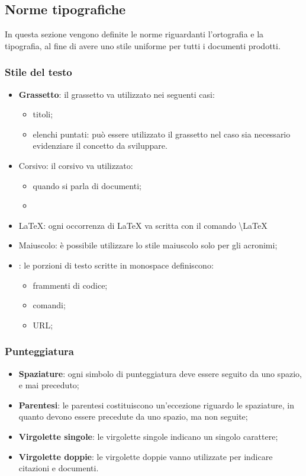 	
	\subsection{Norme tipografiche}
	In questa sezione vengono definite le norme riguardanti l'ortografia e la tipografia, al fine di avere uno stile uniforme per tutti i documenti prodotti.
		\subsubsection{Stile del testo}
		\begin{itemize}
			\item \textbf{Grassetto}: il grassetto va utilizzato nei seguenti casi:
			\begin{itemize}
				\item titoli;
				\item elenchi puntati: può essere utilizzato il grassetto nel caso sia necessario evidenziare il concetto da sviluppare.
			\end{itemize}
			\item Corsivo: il corsivo va utilizzato:
			\begin{itemize}
				\item quando si parla di documenti;
				\item 
			\end{itemize}
			\item \LaTeX: ogni occorrenza di \LaTeX{} va scritta con il comando \textbackslash LaTeX
			\item Maiuscolo: è possibile utilizzare lo stile maiuscolo solo per gli acronimi;
			\item {}: le porzioni di testo scritte in monospace definiscono:
			\begin{itemize}
				\item frammenti di codice;
				\item comandi;
				\item URL;
			\end{itemize} 
		\end{itemize}
		\subsubsection{Punteggiatura}
		\begin{itemize}
			\item \textbf{Spaziature}: ogni simbolo di punteggiatura deve essere seguito da uno spazio, e mai preceduto;
			\item \textbf{Parentesi}: le parentesi costituiscono un'eccezione riguardo le spaziature, in quanto devono essere precedute da uno spazio, ma non seguite;
			\item \textbf{Virgolette singole}: le virgolette singole indicano un singolo carattere;
			\item \textbf{Virgolette doppie}: le virgolette doppie vanno utilizzate per indicare citazioni e documenti.
		\end{itemize}
